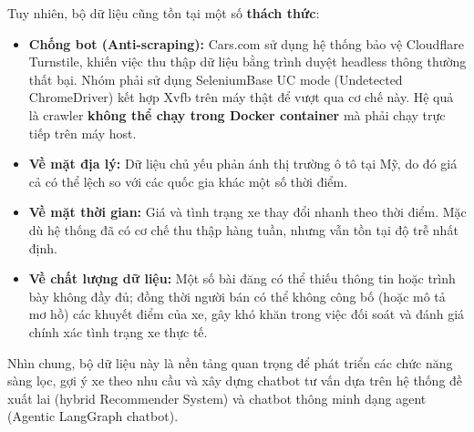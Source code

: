 \noindent Tuy nhiên, bộ dữ liệu cũng tồn tại một số \textbf{thách thức}:
\begin{itemize}
    \item \textbf{Chống bot (Anti-scraping):} Cars.com sử dụng hệ thống bảo vệ Cloudflare Turnstile, khiến việc thu thập dữ liệu bằng trình duyệt headless thông thường thất bại. Nhóm phải sử dụng SeleniumBase UC mode (Undetected ChromeDriver) kết hợp Xvfb trên máy thật để vượt qua cơ chế này. Hệ quả là crawler \textbf{không thể chạy trong Docker container} mà phải chạy trực tiếp trên máy host.
    \item \textbf{Về mặt địa lý:} Dữ liệu chủ yếu phản ánh thị trường ô tô tại Mỹ, do đó giá cả có thể lệch so với các quốc gia khác một số thời điểm.
    \item \textbf{Về mặt thời gian:} Giá và tình trạng xe thay đổi nhanh theo thời điểm. Mặc dù hệ thống đã có cơ chế thu thập hàng tuần, nhưng vẫn tồn tại độ trễ nhất định.
    \item \textbf{Về chất lượng dữ liệu:} Một số bài đăng có thể thiếu thông tin hoặc trình bày không đầy đủ; đồng thời người bán có thể không công bố (hoặc mô tả mơ hồ) các khuyết điểm của xe, gây khó khăn trong việc đối soát và đánh giá chính xác tình trạng xe thực tế.
\end{itemize}

\noindent Nhìn chung, bộ dữ liệu này là nền tảng quan trọng để phát triển các chức năng sàng lọc, gợi ý xe theo nhu cầu và xây dựng chatbot tư vấn dựa trên hệ thống đề xuất lai (hybrid Recommender System) và chatbot thông minh dạng agent (Agentic LangGraph chatbot).
